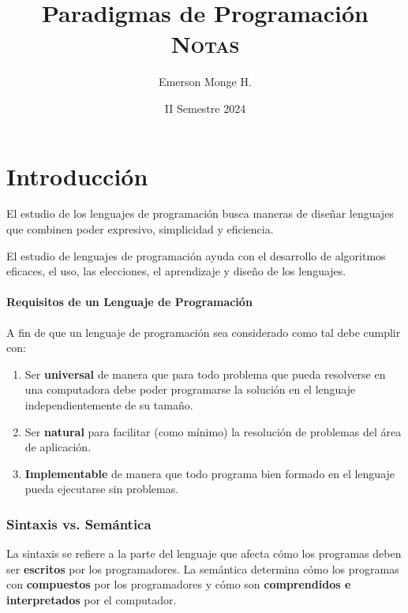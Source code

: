 \documentclass{report}
\title{Paradigmas de Programación\\
\textsc{Notas}}
\author{Emerson Monge H.}
\date{II Semestre 2024}
\theoremstyle{mytheoremstyle}
\theoremstyle{mytheoremstyle}
\theoremstyle{myproblemstyle}
\newcommand{\cNLCh}[1]{
    \chapter*{#1}
    \addcontentsline{toc}{chapter}{#1}
    \addtocounter{chapter}{1}
    \setcounter{section}{0}
}
\begin{document}
    \renewcommand{\chaptername}{Capítulo}
    \renewcommand{\contentsname}{Contenidos}

    \maketitle
    
    \tableofcontents

    \cNLCh{Introducción}

    El estudio de los lenguajes de programación busca maneras de diseñar lenguajes que combinen poder expresivo, simplicidad y eficiencia.

    El estudio de lenguajes de programación ayuda con el desarrollo de algoritmos eficaces, el uso, las elecciones, el aprendizaje y diseño de los lenguajes.

    \subsubsection*{Requisitos de un Lenguaje de Programación}

    A fin de que un lenguaje de programación sea considerado como tal debe cumplir con:

    \begin{enumerate}
        \item Ser \textbf{universal} de manera que para todo problema que pueda resolverse en una computadora debe poder programarse la solución en el lenguaje independientemente de su tamaño.
        
        \item Ser \textbf{natural} para facilitar (como mínimo) la resolución de problemas del área de aplicación.
        
        \item \textbf{Implementable} de manera que todo programa bien formado en el lenguaje pueda ejecutarse sin problemas.
    \end{enumerate}
    
    \subsection*{Sintaxis vs. Semántica}

    La sintaxis se refiere a la parte del lenguaje que afecta cómo los programas deben ser \textbf{escritos} por los programadores. La semántica determina cómo los programas con \textbf{compuestos} por los programadores y cómo son \textbf{comprendidos e interpretados} por el computador.
\end{document}

